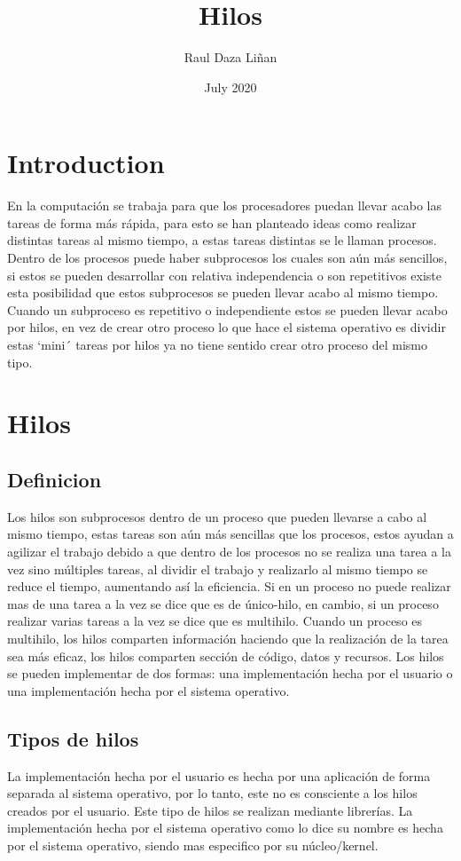 \documentclass[letterpaper, 12pt]{article}
\title{Hilos}
\author{Raul Daza Liñan}
\date{July 2020}
\begin{document}
\maketitle

\section{Introduction}
En la computación se trabaja para que los procesadores puedan llevar acabo las tareas de forma más rápida, para esto se han planteado ideas como realizar distintas tareas al mismo tiempo, a estas tareas distintas se le llaman procesos. Dentro de los procesos puede haber subprocesos los cuales son aún más sencillos, si estos se pueden desarrollar con relativa independencia o son repetitivos existe esta posibilidad que estos subprocesos se pueden llevar acabo al mismo tiempo. Cuando un subproceso es repetitivo o independiente estos se pueden llevar acabo por hilos, en vez de crear otro proceso lo que hace el sistema operativo es dividir estas ‘mini´ tareas por hilos ya no tiene sentido crear otro proceso del mismo tipo.
\section{Hilos}
\subsection{Definicion}
Los hilos son subprocesos dentro de un proceso que pueden llevarse a cabo al mismo tiempo, estas tareas son aún más sencillas que los procesos, estos ayudan a agilizar el trabajo debido a que dentro de los procesos no se realiza una tarea a la vez sino múltiples tareas, al dividir el trabajo y realizarlo al mismo tiempo se reduce el tiempo, aumentando así la eficiencia. Si en un proceso no puede realizar mas de una tarea a la vez se dice que es de único-hilo, en cambio, si un proceso realizar varias tareas a la vez se dice que es multihilo. Cuando un proceso es multihilo, los hilos comparten información haciendo que la realización de la tarea sea más eficaz, los hilos comparten sección de código, datos y recursos.
Los hilos se pueden implementar de dos formas: una implementación hecha por el usuario o una implementación hecha por el sistema operativo.
\subsection{Tipos de hilos}
La implementación hecha por el usuario es hecha por una aplicación de forma separada al sistema operativo, por lo tanto, este no es consciente a los hilos creados por el usuario. Este tipo de hilos se realizan mediante librerías.
La implementación hecha por el sistema operativo como lo dice su nombre es hecha por el sistema operativo, siendo mas especifico por su núcleo/kernel.
\end{document}
